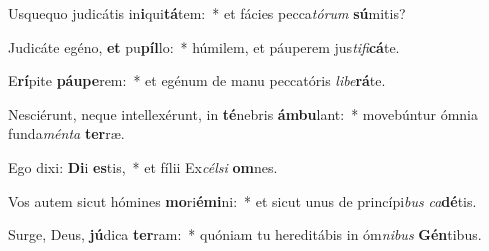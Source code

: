 \item Usquequo judicátis in\textbf{i}qui\textbf{tá}tem:~* et fácies pecca\textit{tó}\textit{rum} \textbf{sú}mitis?
\item Judicáte egéno, \textbf{et} pu\textbf{píl}lo:~* húmilem, et páuperem jus\textit{ti}\textit{fi}\textbf{cá}te.
\item E\textbf{rí}pite \textbf{páu}\textbf{pe}rem:~* et egénum de manu peccatóris \textit{li}\textit{be}\textbf{rá}te.
\item Nesciérunt, neque intellexérunt, in \textbf{té}nebris \textbf{ám}\textbf{bu}lant:~* movebúntur ómnia funda\textit{mén}\textit{ta} \textbf{ter}ræ.
\item Ego dixi: \textbf{Di}i \textbf{es}tis,~* et fílii Ex\textit{cél}\textit{si} \textbf{om}nes.
\item Vos autem sicut hómines \textbf{mo}ri\textbf{é}\textbf{mi}ni:~* et sicut unus de princípi\textit{bus} \textit{ca}\textbf{dé}tis.
\item Surge, Deus, \textbf{jú}dica \textbf{ter}ram:~* quóniam tu hereditábis in óm\textit{ni}\textit{bus} \textbf{Gén}tibus.
